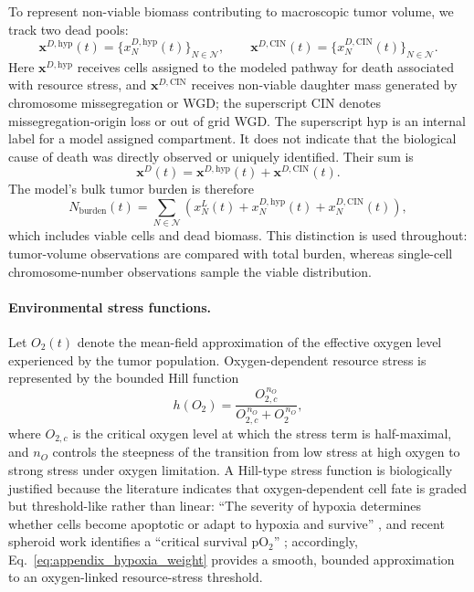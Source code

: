 \documentclass[11pt]{article}
\let\cite\supercite
\begin{document}
To represent non-viable biomass contributing to macroscopic tumor volume, we track two dead pools:
\begin{equation}
\mathbf{x}^{D,\mathrm{hyp}}(t)=\{x_{N}^{D,\mathrm{hyp}}(t)\}_{N\in\mathcal N},
\qquad
\mathbf{x}^{D,\mathrm{CIN}}(t)=\{x_{N}^{D,\mathrm{CIN}}(t)\}_{N\in\mathcal N}.
\label{eq:appendix_dead_pools}
\end{equation}
Here $\mathbf{x}^{D,\mathrm{hyp}}$ receives cells assigned to the modeled pathway for death associated with resource stress, and $\mathbf{x}^{D,\mathrm{CIN}}$ receives non-viable daughter mass generated by chromosome missegregation or WGD; the superscript $\mathrm{CIN}$ denotes missegregation-origin loss or out of grid WGD. The superscript $\mathrm{hyp}$ is an internal label for a model assigned compartment. It does not indicate that the biological cause of death was directly observed or uniquely identified. Their sum is
\begin{equation}
\mathbf{x}^{D}(t)=\mathbf{x}^{D,\mathrm{hyp}}(t)+\mathbf{x}^{D,\mathrm{CIN}}(t).
\label{eq:appendix_total_dead_pool}
\end{equation}
The model's bulk tumor burden is therefore
\begin{equation}
N_{\mathrm{burden}}(t)
=
\sum_{N\in\mathcal N}
\left(x_{N}^L(t)+x_{N}^{D,\mathrm{hyp}}(t)+x_{N}^{D,\mathrm{CIN}}(t)\right),
\label{eq:appendix_tumor_burden}
\end{equation}
which includes viable cells and dead biomass. This distinction is used throughout: tumor-volume observations are compared with total burden, whereas single-cell chromosome-number observations sample the viable distribution.

\paragraph{Environmental stress functions.}

Let $O_2(t)$ denote the mean-field approximation of the effective oxygen level experienced by the tumor population. Oxygen-dependent resource stress is represented by the bounded Hill function
\begin{equation}
h(O_2)=\frac{O_{2,c}^{\,n_O}}{O_{2,c}^{\,n_O}+O_2^{\,n_O}},
\label{eq:appendix_hypoxia_weight}
\end{equation}
where $O_{2,c}$ is the critical oxygen level at which the stress term is half-maximal, and $n_O$ controls the steepness of the transition from low stress at high oxygen to strong stress under oxygen limitation. A Hill-type stress function is biologically justified because the literature indicates that oxygen-dependent cell fate is graded but threshold-like rather than linear: ``The severity of hypoxia determines whether cells become apoptotic or adapt to hypoxia and survive'' \cite{greijer_role_2004}, and recent spheroid work identifies a ``critical survival pO$_2$'' \cite{shang_novel_2024}; accordingly, Eq.~\eqref{eq:appendix_hypoxia_weight} provides a smooth, bounded approximation to an oxygen-linked resource-stress threshold.
\end{document}
